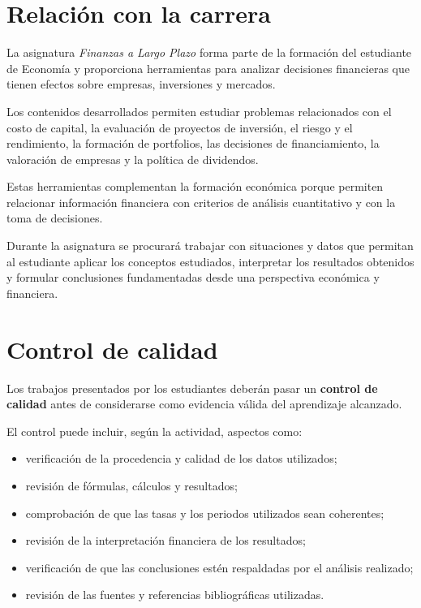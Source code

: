 \documentclass[12pt,a4paper]{article}
\begin{document}
\section{Relación con la carrera}

La asignatura \textit{Finanzas a Largo Plazo} forma parte de la formación
del estudiante de Economía y proporciona herramientas para analizar
decisiones financieras que tienen efectos sobre empresas, inversiones y
mercados.\parencite{uaProgramaFinanzasLargoPlazo}

Los contenidos desarrollados permiten estudiar problemas relacionados con
el costo de capital, la evaluación de proyectos de inversión, el riesgo y
el rendimiento, la formación de portfolios, las decisiones de
financiamiento, la valoración de empresas y la política de dividendos.\parencite{uaProgramaFinanzasLargoPlazo}

Estas herramientas complementan la formación económica porque permiten
relacionar información financiera con criterios de análisis cuantitativo y
con la toma de decisiones.

Durante la asignatura se procurará trabajar con situaciones y datos que
permitan al estudiante aplicar los conceptos estudiados, interpretar los
resultados obtenidos y formular conclusiones fundamentadas desde una
perspectiva económica y financiera.

\section{Control de calidad}

Los trabajos presentados por los estudiantes deberán pasar un
\textbf{control de calidad} antes de considerarse como evidencia válida
del aprendizaje alcanzado.

El control puede incluir, según la actividad, aspectos como:

\begin{itemize}
    \item verificación de la procedencia y calidad de los datos utilizados;
    \item revisión de fórmulas, cálculos y resultados;
    \item comprobación de que las tasas y los periodos utilizados sean coherentes;
    \item revisión de la interpretación financiera de los resultados;
    \item verificación de que las conclusiones estén respaldadas por el análisis realizado;
    \item revisión de las fuentes y referencias bibliográficas utilizadas.
\end{itemize}
\end{document}
